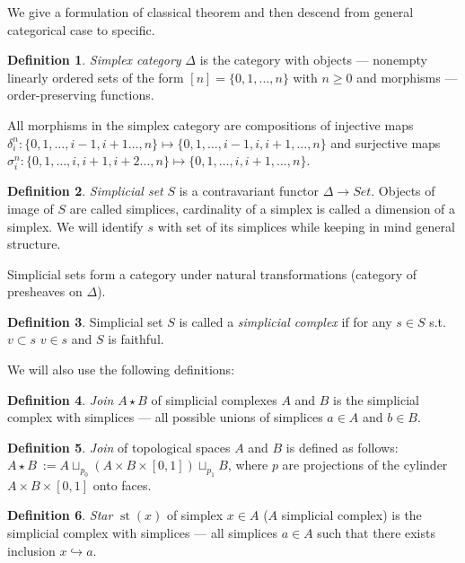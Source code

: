 \documentclass[a4paper, 12pt]{article}
\theoremstyle{definition}
\newtheorem{definition}{Definition}
\theoremstyle{remark}
\newcommand{\define}[1]{{\textit{#1}}}
\renewcommand{\geq}{\geqslant}
\begin{document}
We give a formulation of classical theorem and then descend from general categorical case to specific.\\

\begin{definition}
  \define{Simplex category} $\Delta$ is the category with objects --- nonempty linearly ordered sets of the form $[n] = \{0,1,\ldots,n\}$ with $n \geq 0$ and morphisms --- order-preserving functions.
\end{definition}

All morphisms in the simplex category are compositions of injective maps $\delta_i^n : \{0,1,\ldots,i-1,i+1\ldots,n\} \mapsto \{0,1,\ldots,i-1,i,i+1,\ldots,n\}$ and surjective maps $\sigma^n_i : \{0,1,\ldots,i,i+1,i+2\ldots,n\} \mapsto \{0,1,\ldots,i,i+1,\ldots,n\}$.

\begin{definition}
  \define{Simplicial set} $S$ is a contravariant functor $\Delta \to Set$. Objects of image of $S$ are called simplices, cardinality of a simplex is called a dimension of a simplex. We will identify $s$ with set of its simplices while keeping in mind general structure.
\end{definition}

Simplicial sets form a category under natural transformations (category of presheaves on $\Delta$).\\

\begin{definition}
  Simplicial set $S$ is called a \define{simplicial complex} if for any $s \in S$ s.t. $v \subset s$  $v \in s$ and $S$ is faithful.
\end{definition}

We will also use the following definitions:

\begin{definition}
  \define{Join} $A \star B$ of simplicial complexes $A$ and $B$ is the simplicial complex with simplices --- all possible unions of simplices $a \in A$ and $b \in B$.
\end{definition}

\begin{definition}
  \define{Join} of topological spaces $A$ and $B$ is defined as follows: $A \star B\ := A \sqcup_{p_0} (A \times B \times [0,1]) \sqcup_{p_1} B$, where $p$ are projections of the cylinder $A \times B \times [0,1]$ onto faces.
\end{definition}

\begin{definition}
  \define{Star} $\operatorname{st}(x)$ of simplex $x \in A$ ($A$ simplicial complex) is the simplicial complex with simplices --- all simplices $a \in A$ such that there exists inclusion $x \hookrightarrow a$.
\end{definition}
\end{document}
